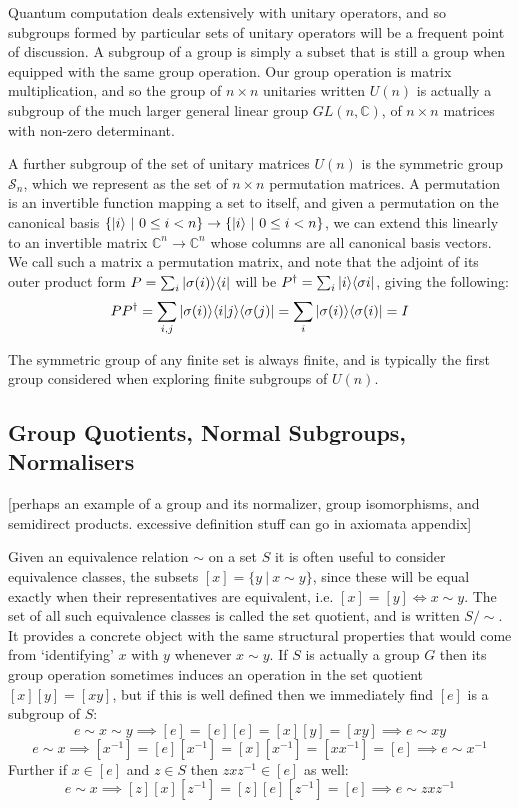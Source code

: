 Quantum computation deals extensively with unitary operators, and so subgroups formed by particular sets of unitary operators will be a frequent point of discussion. A subgroup of a group is simply a subset that is still a group when equipped with the same group operation. Our group operation is matrix multiplication, and so the group of $n \times n$ unitaries written $U(n)$ is actually a subgroup of the much larger general linear group $GL(n, \mathbb{C})$, of $n \times n$ matrices with non-zero determinant.

A further subgroup of the set of unitary matrices $U(n)$ is the symmetric group $\mathcal{S}_n$, which we represent as the set of $n \times n$ permutation matrices. A permutation is an invertible function mapping a set to itself, and given a permutation on the canonical basis $\{| i \rangle\ |\ 0 \leq i < n\} \to \{| i \rangle\ |\ 0 \leq i < n\}$, we can extend this linearly to an invertible matrix $\mathbb{C}^n \to \mathbb{C}^n$ whose columns are all canonical basis vectors. We call such a matrix a permutation matrix, and note that the adjoint of its outer product form $P = \sum_i | \sigma(i) \rangle\langle i |$ will be $P^{\dagger} = \sum_i | i \rangle\langle \sigma{i} |$, giving the following:
\begin{align*}
	PP^\dagger = \sum_{i,j} | \sigma(i) \rangle\langle i | j \rangle\langle \sigma(j) | = \sum_i | \sigma(i) \rangle\langle \sigma(i) | = I
\end{align*}

The symmetric group of any finite set is always finite, and is typically the first group considered when exploring finite subgroups of $U(n)$.
\subsection{Group Quotients, Normal Subgroups, Normalisers}
[perhaps an example of a group and its normalizer, group isomorphisms, and semidirect products. excessive definition stuff can go in axiomata appendix]

Given an equivalence relation $\sim$ on a set $S$ it is often useful to consider equivalence classes, the subsets $[x] = \{y\ |\ x \sim y\}$, since these will be equal exactly when their representatives are equivalent, i.e. $[x] = [y] \iff x \sim y$. The set of all such equivalence classes is called the set quotient, and is written $S/\sim$. It provides a concrete object with the same structural properties that would come from `identifying' $x$ with $y$ whenever $x \sim y$. If $S$ is actually a group $G$ then its group operation sometimes induces an operation in the set quotient $[x][y] = [xy]$, but if this is well defined then we immediately find $[e]$ is a subgroup of $S$:
\[e \sim x \sim y \implies [e] = [e][e] = [x][y] = [xy] \implies e \sim xy\]
\[e \sim x \implies [x^{-1}] = [e][x^{-1}] = [x][x^{-1}] = [xx^{-1}] = [e] \implies e \sim x^{-1}\]
Further if $x \in [e]$ and $z \in S$ then $zxz^{-1} \in [e]$ as well:
\[e \sim x \implies [z][x][z^{-1}] = [z][e][z^{-1}] = [e] \implies e \sim zxz^{-1}\]

